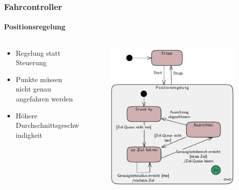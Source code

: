 \begin{frame}
\frametitle{Fahrcontroller}
\framesubtitle{Positionsregelung}

\begin{columns}
	\begin{column}{0.53 \textwidth}
		\begin{itemize}
			\item Regelung statt Steuerung
			\item Punkte müssen nicht genau angefahren werden
			\item Höhere Durchschnittsgeschwindigkeit
		\end{itemize}
	\end{column}
	\begin{column}{0.47 \textwidth}
		\vspace{-4em}
		\begin{figure}[h]
			\centering
			\includegraphics[width = 1.02 \textwidth]{../images/DC/PosControlPres.pdf}
		\end{figure}
	\end{column}
\end{columns}

\end{frame}

